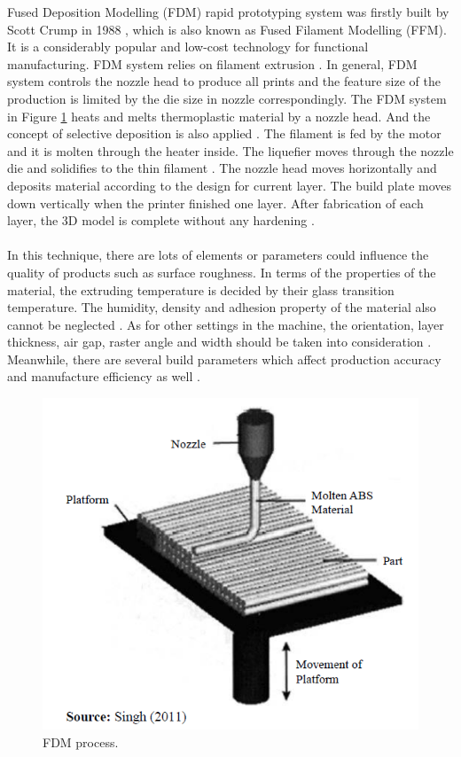Fused Deposition Modelling (FDM) rapid prototyping system was firstly built by Scott Crump in 1988 \cite{hashmi2014comprehensive}, which is also known as Fused Filament Modelling (FFM). It is a considerably popular and low-cost technology for functional manufacturing. FDM system relies on filament extrusion \cite{carneiro2015fused}. In general, FDM system controls the nozzle head to produce all prints and the feature size of the production is limited by the die size in nozzle correspondingly. The FDM system in Figure \ref{Fig:FDM} heats and melts thermoplastic material by a nozzle head. And the concept of selective deposition is also applied \cite{dul2016fused}. The filament is fed by the motor and it is molten through the heater inside. The liquefier moves through the nozzle die and solidifies to the thin filament \cite{singh2014process}. The nozzle head moves horizontally and deposits material according to the design for current layer. The build plate moves down vertically when the printer finished one layer. After fabrication of each layer, the 3D model is complete without any hardening \cite{jin2015quantitative}.\\
\\
In this technique, there are lots of elements or parameters could influence the quality of products such as surface roughness. In terms of the properties of the material, the extruding temperature is decided by their glass transition temperature. The humidity, density and adhesion property of the material also cannot be neglected \cite{chohan2016mathematical}\cite{costa2017estimation}. As for other settings in the machine, the orientation, layer thickness, air gap, raster angle and width should be taken into consideration \cite{rao2016optimization}. Meanwhile, there are several build parameters which affect production accuracy and manufacture efficiency as well \cite{griffiths2016effect}\cite{boschetto2016design}.
 
\begin{figure}[htbp]
  \centering
  \includegraphics[scale=0.6]{Figs//FDM_process.PNG}
  \caption[FDM process]{\footnotesize FDM process.}
  \label{Fig:FDM}
\end{figure}

